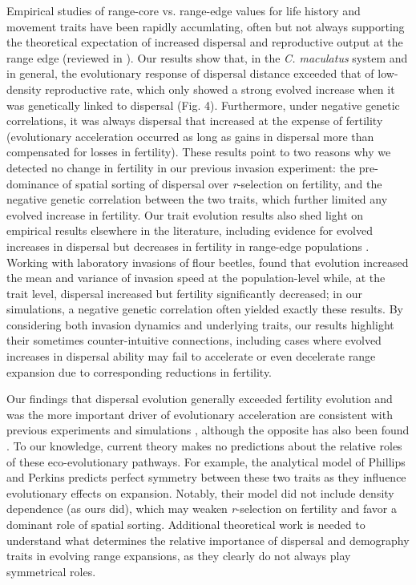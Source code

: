 \documentclass[11pt]{article}
\begin{document}
Empirical studies of range-core vs. range-edge values for life history and movement traits have been rapidly accumlating, often but not always supporting the theoretical expectation of increased dispersal and reproductive output at the range edge (reviewed in \citealt{chuang_expanding_2016}).
Our results show that, in the \textit{C. maculatus} system and in general, the evolutionary response of dispersal distance exceeded that of low-density reproductive rate, which only showed a strong evolved increase when it was genetically linked to dispersal (Fig. 4).
Furthermore, under negative genetic correlations, it was always dispersal that increased at the expense of fertility (evolutionary acceleration occurred as long as gains in dispersal more than compensated for losses in fertility).
These results point to two reasons why we detected no change in fertility in our previous invasion experiment: the pre-dominance of spatial sorting of dispersal over \textit{r}-selection on fertility, and the negative genetic correlation between the two traits, which further limited any evolved increase in fertility.
Our trait evolution results also shed light on empirical results elsewhere in the literature, including evidence for evolved increases in dispersal but decreases in fertility in range-edge populations \citep{simmons_changes_2004,hughes_evolutionary_2003}.
Working with laboratory invasions of flour beetles, \cite{weiss-lehman_rapid_2017} found that evolution increased the mean and variance of invasion speed at the population-level while, at the trait level, dispersal increased but fertility significantly decreased; in our simulations, a negative genetic correlation often yielded exactly these results.
By considering both invasion dynamics and underlying traits, our results highlight their sometimes counter-intuitive connections, including cases where evolved increases in dispersal ability may fail to accelerate or even decelerate range expansion due to corresponding reductions in fertility.

Our findings that dispersal evolution generally exceeded fertility evolution and was the more important driver of evolutionary acceleration are consistent with previous experiments \citep{weiss-lehman_rapid_2017} and simulations \citep{burton_trade-offs_2010}, although the opposite has also been found \citep{van2018kin}.
To our knowledge, current theory makes no predictions about the relative roles of these eco-evolutionary pathways.
For example, the analytical model of Phillips and Perkins \citeyearpar{phillips2018spatial} predicts perfect symmetry between these two traits as they influence evolutionary effects on expansion.
Notably, their model did not include density dependence (as ours did), which may weaken \textit{r}-selection on fertility and favor a dominant role of spatial sorting.
Additional theoretical work is needed to understand what determines the relative importance of dispersal and demography traits in evolving range expansions, as they clearly do not always play symmetrical roles.
\end{document}
